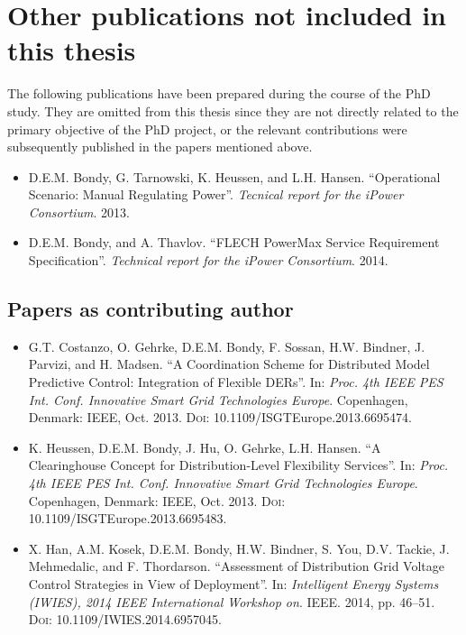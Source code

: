 \section*{Other publications not included in this thesis}
The following publications have been prepared during the course of the PhD study. They are omitted from this thesis since they are not directly related to the primary objective of the PhD project, or the relevant contributions were subsequently published in the papers mentioned above.
\begin{itemize}
	\item D.E.M. Bondy, G. Tarnowski, K. Heussen, and L.H. Hansen. ``Operational Scenario: Manual Regulating Power''. \emph{Tecnical report for the iPower Consortium}. 2013.
	\item D.E.M. Bondy, and A. Thavlov. ``FLECH PowerMax Service Requirement Specification''. \emph{Technical report for the iPower Consortium}. 2014.
\end{itemize}

\subsection*{Papers as contributing author}
\begin{itemize}
	\item G.T. Costanzo, O. Gehrke, D.E.M. Bondy, F. Sossan, H.W. Bindner, J. Parvizi, and H. Madsen. ``A Coordination Scheme for Distributed Model Predictive Control: Integration of Flexible DERs''. In: \emph{Proc. 4th IEEE PES Int. Conf. Innovative Smart Grid Technologies Europe}. Copenhagen, Denmark: IEEE, Oct. 2013. \textsc{Doi}: 10.1109/ISGTEurope.2013.6695474.
	\item K. Heussen, D.E.M. Bondy, J. Hu, O. Gehrke, L.H. Hansen. ``A Clearinghouse Concept for Distribution-Level Flexibility Services''. In: \emph{Proc. 4th IEEE PES Int. Conf. Innovative Smart Grid Technologies Europe}. Copenhagen, Denmark: IEEE, Oct. 2013. \textsc{Doi}: 10.1109/ISGTEurope.2013.6695483.
	\item X. Han, A.M. Kosek, D.E.M. Bondy, H.W. Bindner, S. You, D.V. Tackie, J. Mehmedalic, and F. Thordarson. ``Assessment of Distribution Grid Voltage Control Strategies in View of Deployment''. In: \emph{Intelligent Energy Systems (IWIES), 2014 IEEE International Workshop on}. IEEE. 2014, pp. 46–51. \textsc{Doi}: 10.1109/IWIES.2014.6957045.
\end{itemize}
